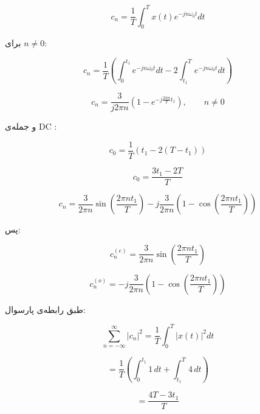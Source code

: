 
\[
c_n=\frac1T\int_0^T x(t)e^{-jn\omega_0 t}dt
\]

برای \(n\neq0\):

\[
c_n=
\frac1T
\left(
\int_0^{t_1} e^{-jn\omega_0 t}dt
-2\int_{t_1}^{T} e^{-jn\omega_0 t}dt
\right)
\]

\[
c_n=
\frac{3}{j2\pi n}
\left(
1-e^{-j\frac{2\pi n}{T}t_1}
\right)
,\qquad n\neq0
\]

و جمله‌ی DC :

\[
c_0=
\frac1T
\left(
t_1-2(T-t_1)
\right)
\]

\[
c_0=
\frac{3t_1-2T}{T}
\]


\[
c_n=
\frac{3}{2\pi n}
\sin\left(\frac{2\pi n t_1}{T}\right)
-j\frac{3}{2\pi n}
\left(
1-\cos\left(\frac{2\pi n t_1}{T}\right)
\right)
\]

پس:

\[
c_n^{(e)}=
\frac{3}{2\pi n}
\sin\left(\frac{2\pi n t_1}{T}\right)
\]

\[
c_n^{(o)}=
-j\frac{3}{2\pi n}
\left(
1-\cos\left(\frac{2\pi n t_1}{T}\right)
\right)
\]


طبق رابطه‌ی پارسوال:

\[
\sum_{n=-\infty}^{\infty}|c_n|^2
=
\frac1T\int_0^T |x(t)|^2dt
\]

\[
=
\frac1T
\left(
\int_0^{t_1}1\,dt
+
\int_{t_1}^{T}4\,dt
\right)
\]

\[
=
\frac{4T-3t_1}{T}
\]

